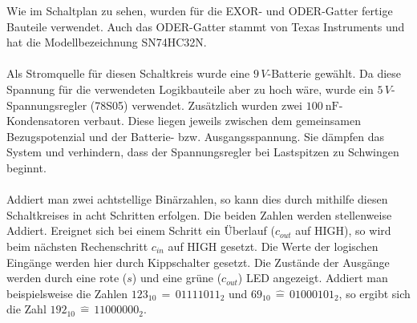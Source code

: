 Wie im Schaltplan zu sehen, wurden für die EXOR- und ODER-Gatter fertige Bauteile verwendet. Auch das ODER-Gatter stammt von Texas Instruments und hat die Modellbezeichnung SN74HC32N.\\\\
Als Stromquelle für diesen Schaltkreis wurde eine $9\,V$-Batterie gewählt. Da diese Spannung für die verwendeten Logikbauteile aber zu hoch wäre, wurde ein $5\,V$-Spannungsregler (78S05) verwendet. Zusätzlich wurden zwei $\SI{100}{\nano\farad}$-Kondensatoren verbaut. Diese liegen jeweils zwischen dem gemeinsamen Bezugspotenzial und der Batterie- bzw. Ausgangsspannung. Sie dämpfen das System und verhindern, dass der Spannungsregler bei Lastspitzen zu Schwingen beginnt.\\\\
Addiert man zwei achtstellige Binärzahlen, so kann dies durch mithilfe diesen Schaltkreises in acht Schritten erfolgen. Die beiden Zahlen werden stellenweise Addiert. Ereignet sich bei einem Schritt ein Überlauf ($c_{out}$ auf HIGH), so wird beim nächsten Rechenschritt $c_{in}$ auf HIGH gesetzt. Die Werte der logischen Eingänge werden hier durch Kippschalter gesetzt. Die Zustände der Ausgänge werden durch eine rote ($s$) und eine grüne ($c_{out}$) LED angezeigt. Addiert man beispielsweise die Zahlen $123_{10}\,\widehat{=}\,01111011_2$ und $69_{10}\,\widehat{=}\,01000101_2$, so ergibt sich die Zahl $192_{10}\,\widehat{=}\,11000000_2$.\\
\newpage
